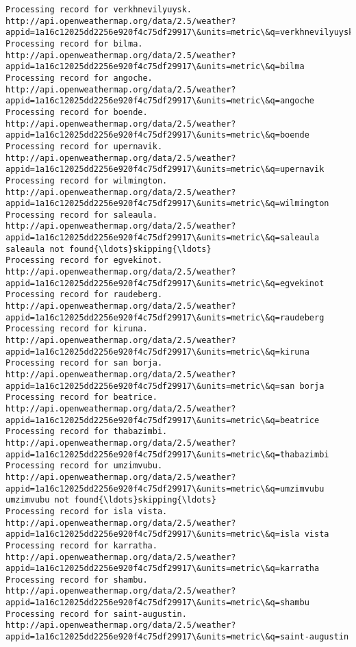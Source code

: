 \documentclass[11pt]{article}
\begin{document}
\begin{Verbatim}[commandchars=\\\{\}]
Processing record for verkhnevilyuysk.
http://api.openweathermap.org/data/2.5/weather?appid=1a16c12025dd2256e920f4c75df29917\&units=metric\&q=verkhnevilyuysk
Processing record for bilma.
http://api.openweathermap.org/data/2.5/weather?appid=1a16c12025dd2256e920f4c75df29917\&units=metric\&q=bilma
Processing record for angoche.
http://api.openweathermap.org/data/2.5/weather?appid=1a16c12025dd2256e920f4c75df29917\&units=metric\&q=angoche
Processing record for boende.
http://api.openweathermap.org/data/2.5/weather?appid=1a16c12025dd2256e920f4c75df29917\&units=metric\&q=boende
Processing record for upernavik.
http://api.openweathermap.org/data/2.5/weather?appid=1a16c12025dd2256e920f4c75df29917\&units=metric\&q=upernavik
Processing record for wilmington.
http://api.openweathermap.org/data/2.5/weather?appid=1a16c12025dd2256e920f4c75df29917\&units=metric\&q=wilmington
Processing record for saleaula.
http://api.openweathermap.org/data/2.5/weather?appid=1a16c12025dd2256e920f4c75df29917\&units=metric\&q=saleaula
saleaula not found{\ldots}skipping{\ldots}
Processing record for egvekinot.
http://api.openweathermap.org/data/2.5/weather?appid=1a16c12025dd2256e920f4c75df29917\&units=metric\&q=egvekinot
Processing record for raudeberg.
http://api.openweathermap.org/data/2.5/weather?appid=1a16c12025dd2256e920f4c75df29917\&units=metric\&q=raudeberg
Processing record for kiruna.
http://api.openweathermap.org/data/2.5/weather?appid=1a16c12025dd2256e920f4c75df29917\&units=metric\&q=kiruna
Processing record for san borja.
http://api.openweathermap.org/data/2.5/weather?appid=1a16c12025dd2256e920f4c75df29917\&units=metric\&q=san borja
Processing record for beatrice.
http://api.openweathermap.org/data/2.5/weather?appid=1a16c12025dd2256e920f4c75df29917\&units=metric\&q=beatrice
Processing record for thabazimbi.
http://api.openweathermap.org/data/2.5/weather?appid=1a16c12025dd2256e920f4c75df29917\&units=metric\&q=thabazimbi
Processing record for umzimvubu.
http://api.openweathermap.org/data/2.5/weather?appid=1a16c12025dd2256e920f4c75df29917\&units=metric\&q=umzimvubu
umzimvubu not found{\ldots}skipping{\ldots}
Processing record for isla vista.
http://api.openweathermap.org/data/2.5/weather?appid=1a16c12025dd2256e920f4c75df29917\&units=metric\&q=isla vista
Processing record for karratha.
http://api.openweathermap.org/data/2.5/weather?appid=1a16c12025dd2256e920f4c75df29917\&units=metric\&q=karratha
Processing record for shambu.
http://api.openweathermap.org/data/2.5/weather?appid=1a16c12025dd2256e920f4c75df29917\&units=metric\&q=shambu
Processing record for saint-augustin.
http://api.openweathermap.org/data/2.5/weather?appid=1a16c12025dd2256e920f4c75df29917\&units=metric\&q=saint-augustin

\end{Verbatim}
\end{document}
